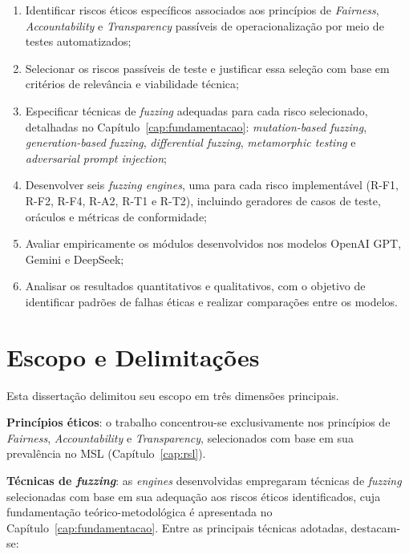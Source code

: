\begin{enumerate}
    \item Identificar riscos éticos específicos associados aos princípios de \textit{Fairness}, \textit{Accountability} e \textit{Transparency} passíveis de operacionalização por meio de testes automatizados;
    \item Selecionar os riscos passíveis de teste e justificar essa seleção com base em critérios de relevância e viabilidade técnica;
    \item Especificar técnicas de \textit{fuzzing} adequadas para cada risco selecionado, detalhadas no Capítulo~\ref{cap:fundamentacao}: \textit{mutation-based fuzzing}, \textit{generation-based fuzzing}, \textit{differential fuzzing}, \textit{metamorphic testing} e \textit{adversarial prompt injection};
    \item Desenvolver seis \textit{fuzzing engines}, uma para cada risco implementável (R-F1, R-F2, R-F4, R-A2, R-T1 e R-T2), incluindo geradores de casos de teste, oráculos e métricas de conformidade;
    \item Avaliar empiricamente os módulos desenvolvidos nos modelos OpenAI GPT, Gemini e DeepSeek;
    \item Analisar os resultados quantitativos e qualitativos, com o objetivo de identificar padrões de falhas éticas e realizar comparações entre os modelos.
\end{enumerate}

\section{Escopo e Delimitações}
\label{sec:escopo}

Esta dissertação delimitou seu escopo em três dimensões principais.

\textbf{Princípios éticos}: o trabalho concentrou-se exclusivamente nos princípios de \textit{Fairness}, \textit{Accountability} e \textit{Transparency}, selecionados com base em sua prevalência no MSL (Capítulo~\ref{cap:rsl}).

\textbf{Técnicas de \textit{fuzzing}}: as \textit{engines} desenvolvidas empregaram técnicas de \textit{fuzzing} selecionadas com base em sua adequação aos riscos éticos identificados, cuja fundamentação teórico-metodológica é apresentada no Capítulo~\ref{cap:fundamentacao}. Entre as principais técnicas adotadas, destacam-se:

